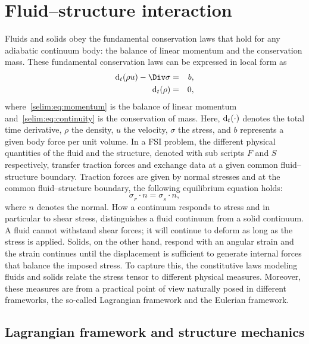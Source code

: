 \section{Fluid--structure interaction}
\label{selim:sec:fsi}
Fluids and solids obey the fundamental conservation laws that hold
for any adiabatic continuum body: the balance of linear momentum and
the conservation mass.  These fundamental conservation laws can be
expressed in local form as
\begin{eqnarray}
\label{selim:eq:momentum}
\subdt(\rho u) - \Div \sigma &=& b, \\
\label{selim:eq:continuity}
\subdt(\rho )  &=& 0,
\end{eqnarray}
where~\eqref{selim:eq:momentum} is the balance of linear momentum
and~\eqref{selim:eq:continuity} is the conservation of mass.  Here,
$\textrm{d}_t(\cdot)$ denotes the total time derivative, $\rho$ the density,
$u$ the velocity, $\sigma$ the stress, and $b$ represents a given body
force per unit volume. In a FSI problem, the different physical
quantities of the fluid and the structure, denoted with sub scripts
$F$ and $S$ respectively, transfer traction forces and exchange data
at a given common fluid--structure boundary.  Traction forces are
given by normal stresses and at the common fluid--structure boundary,
the following equilibrium equation holds:
\begin{equation}
\label{selim:eq:traction}
\sigma_{_{F}}\cdot n =  \sigma_{_{S}}\cdot n,
\end{equation}
where $n$ denotes the normal.  How a continuum responds to stress and
in particular to shear stress, distinguishes a fluid continuum from a
solid continuum. A fluid cannot withstand shear forces; it will
continue to deform as long as the stress is applied. Solids, on the
other hand, respond with an angular strain and the strain continues
until the displacement is sufficient to generate internal forces that
balance the imposed stress. To capture this, the constitutive laws
modeling fluids and solids relate the stress tensor to different
physical measures. Moreover, these measures are from a practical point
of view naturally posed in different frameworks, the so-called
Lagrangian framework and the Eulerian framework.

\subsection{ Lagrangian framework and structure mechanics}

